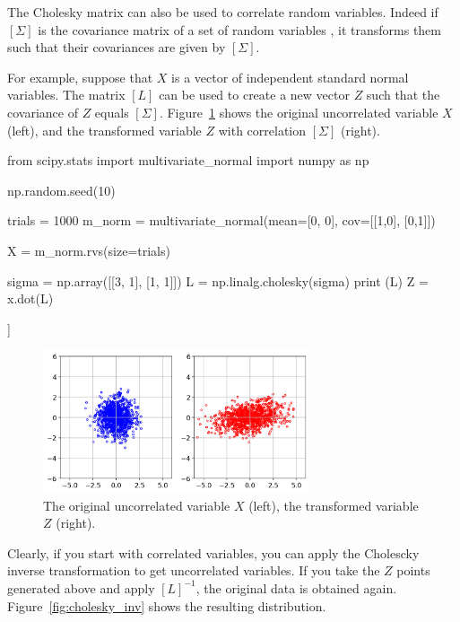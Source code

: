 The Cholesky matrix can also be used to correlate random variables. Indeed if $[\Sigma]$ is the covariance matrix of a set of random variables , it transforms them such that their covariances are given by $[\Sigma]$. 

For example, suppose that $X$ is a vector of independent standard normal variables. The matrix $[L]$ can be used to create a new vector $Z$ such that the covariance of $Z$ equals $[\Sigma]$.
Figure~\ref{fig:cholesky_norm} shows the original uncorrelated variable $X$ (left), and the transformed variable $Z$ with correlation $[\Sigma]$ (right).

\begin{ipython}
from scipy.stats import multivariate_normal
import numpy as np

np.random.seed(10)

trials = 1000
m_norm = multivariate_normal(mean=[0, 0], cov=[[1,0],
                                               [0,1]])

X = m_norm.rvs(size=trials)

sigma = np.array([[3, 1], [1, 1]])
L = np.linalg.cholesky(sigma)
print (L)
Z = x.dot(L)
\end{ipython}
\begin{ioutput}
[[1.73205081 0.        ]
 [0.57735027 0.81649658]]
\end{ioutput}

\begin{figure}[htbp]
\centering
\includegraphics[width=0.7\textwidth]{figures/cholesky_norm}
\caption{The original uncorrelated variable $X$ (left), the transformed variable $Z$ (right).}
\label{fig:cholesky_norm}
\end{figure}

Clearly, if you start with correlated variables, you can apply the Cholescky inverse transformation to get uncorrelated variables.
If you take the $Z$ points generated above and apply $[L]^{-1}$, the original data is obtained again. Figure~\ref{fig:cholesky_inv} shows the resulting distribution.

